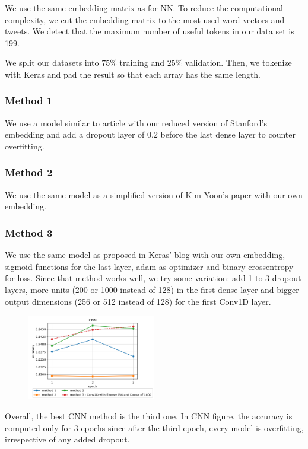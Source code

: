 \documentclass[11pt, a4paper, twocolumn]{article}
\begin{document}
We use the same embedding matrix as for NN\cite{glovepaper, gloveembedding}. To reduce the computational complexity, we cut the embedding matrix to the most used word vectors and tweets. We detect that the maximum number of useful tokens in our data set is 199\label{199}.

We split our datasets into $75\%$ training and $25\%$ validation. Then, we tokenize with Keras and pad the result so that each array has the same length.

\subsubsection{Method 1}
We use a model similar to article\cite{cnn1} with our reduced version of Stanford's embedding and add a dropout layer of 0.2 before the last dense layer to counter overfitting.

\subsubsection{Method 2}
We use the same model as a simplified version\cite{cnn2} of Kim Yoon's paper\cite{kimyoonpaper} with our own embedding.

\subsubsection{Method 3}
We use the same model as proposed in Keras' blog\cite{cnn3} with our own embedding, sigmoid functions for the last layer, adam as optimizer and binary crossentropy for loss.
Since that method works well, we try some variation: add 1 to 3 dropout layers, more units (200 or 1000 instead of 128) in the first dense layer and bigger output dimensions (256 or 512 instead of 128) for the first Conv1D layer. 

\begin{figure}[h]
	\centering
	\includegraphics[width=0.5\textwidth]{../plots/cnn.png}
\end{figure}

Overall, the best CNN method is the third one. In CNN figure, the accuracy is computed only for 3 epochs since after the third epoch, every model is overfitting, irrespective of any added dropout.
\end{document}
